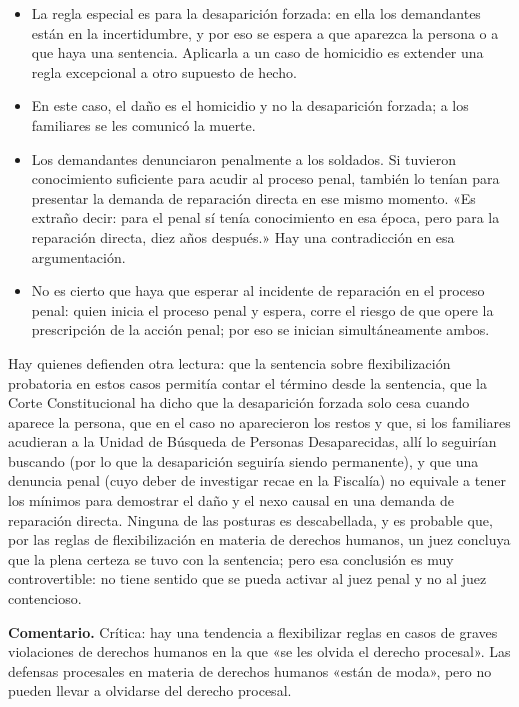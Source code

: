 \begin{itemize}
\item La regla especial es para la desaparición forzada: en ella los demandantes están en la incertidumbre, y por eso se espera a que aparezca la persona o a que haya una sentencia. Aplicarla a un caso de homicidio es extender una regla excepcional a otro supuesto de hecho.
\item En este caso, el daño es el homicidio y no la desaparición forzada; a los familiares se les comunicó la muerte.
\item Los demandantes denunciaron penalmente a los soldados. Si tuvieron conocimiento suficiente para acudir al proceso penal, también lo tenían para presentar la demanda de reparación directa en ese mismo momento. «Es extraño decir: para el penal sí tenía conocimiento en esa época, pero para la reparación directa, diez años después.» Hay una contradicción en esa argumentación.
\item No es cierto que haya que esperar al incidente de reparación en el proceso penal: quien inicia el proceso penal y espera, corre el riesgo de que opere la prescripción de la acción penal; por eso se inician simultáneamente ambos.
\end{itemize}
Hay quienes defienden otra lectura: que la sentencia sobre flexibilización probatoria en estos casos permitía contar el término desde la sentencia, que la Corte Constitucional ha dicho que la desaparición forzada solo cesa cuando aparece la persona, que en el caso no aparecieron los restos y que, si los familiares acudieran a la Unidad de Búsqueda de Personas Desaparecidas, allí lo seguirían buscando (por lo que la desaparición seguiría siendo permanente), y que una denuncia penal (cuyo deber de investigar recae en la Fiscalía) no equivale a tener los mínimos para demostrar el daño y el nexo causal en una demanda de reparación directa. Ninguna de las posturas es descabellada, y es probable que, por las reglas de flexibilización en materia de derechos humanos, un juez concluya que la plena certeza se tuvo con la sentencia; pero esa conclusión es muy controvertible: no tiene sentido que se pueda activar al juez penal y no al juez contencioso.

\begin{comentario}
\textcolor[HTML]{8A6D3B}{\textbf{Comentario. }}Crítica: hay una tendencia a flexibilizar reglas en casos de graves violaciones de derechos humanos en la que «se les olvida el derecho procesal». Las defensas procesales en materia de derechos humanos «están de moda», pero no pueden llevar a olvidarse del derecho procesal.
\end{comentario}
